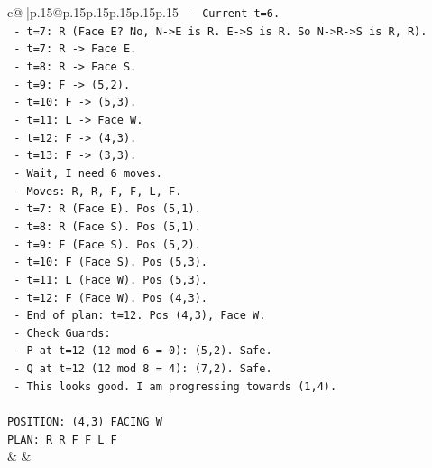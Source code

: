 \documentclass{article}
\begin{document}
{\begin{supertabular}{c@{$\;$}|p{.15\linewidth}@{}p{.15\linewidth}p{.15\linewidth}p{.15\linewidth}p{.15\linewidth}p{.15\linewidth}}
{{{\texttt{  {-} Current t=6.} \\
\texttt{  {-} t=7: R (Face E? No, N{-}>E is R. E{-}>S is R. So N{-}>R{-}>S is R, R).} \\
\texttt{    {-} t=7: R {-}> Face E.} \\
\texttt{    {-} t=8: R {-}> Face S.} \\
\texttt{    {-} t=9: F {-}> (5,2).} \\
\texttt{    {-} t=10: F {-}> (5,3).} \\
\texttt{    {-} t=11: L {-}> Face W.} \\
\texttt{    {-} t=12: F {-}> (4,3).} \\
\texttt{    {-} t=13: F {-}> (3,3).} \\
\texttt{  {-} Wait, I need 6 moves.} \\
\texttt{  {-} Moves: R, R, F, F, L, F.} \\
\texttt{  {-} t=7: R (Face E). Pos (5,1).} \\
\texttt{  {-} t=8: R (Face S). Pos (5,1).} \\
\texttt{  {-} t=9: F (Face S). Pos (5,2).} \\
\texttt{  {-} t=10: F (Face S). Pos (5,3).} \\
\texttt{  {-} t=11: L (Face W). Pos (5,3).} \\
\texttt{  {-} t=12: F (Face W). Pos (4,3).} \\
\texttt{  {-} End of plan: t=12. Pos (4,3), Face W.} \\
\texttt{  {-} Check Guards:} \\
\texttt{    {-} P at t=12 (12 mod 6 = 0): (5,2). Safe.} \\
\texttt{    {-} Q at t=12 (12 mod 8 = 4): (7,2). Safe.} \\
\texttt{  {-} This looks good. I am progressing towards (1,4).} \\
\\ 
\texttt{POSITION: (4,3) FACING W} \\
\texttt{PLAN: R R F F L F} \\
            }
        }
    }
    & & \\ \\


\end{supertabular}}
\end{document}
